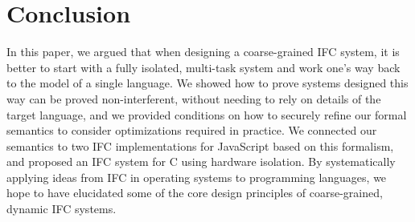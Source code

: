 \section{Conclusion}
\label{sec:conclusion}

In this paper, we argued that when designing a coarse-grained IFC
system, it is better to start with a fully isolated, multi-task system
and work one's way back to the model of a single language.  We showed
how to prove systems designed this way can be proved non-interferent,
without needing to rely on details of the target language, and
we provided conditions on how to securely refine our formal semantics to
consider optimizations required in practice.  We connected our semantics
to two IFC implementations for JavaScript based on this formalism,
and proposed
an IFC system for C using hardware isolation.
By systematically applying ideas from IFC in operating systems to programming languages,
we hope to have elucidated some of the core design principles of coarse-grained,
dynamic IFC systems.


